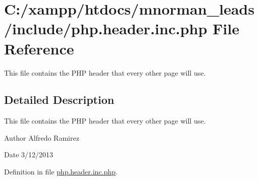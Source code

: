 \hypertarget{php_8header_8inc_8php}{\section{C\-:/xampp/htdocs/mnorman\-\_\-leads/include/php.header.\-inc.\-php File Reference}
\label{php_8header_8inc_8php}
}


This file contains the P\-H\-P header that every other page will use.  




\subsection{Detailed Description}
This file contains the P\-H\-P header that every other page will use. \begin{DoxyAuthor}{Author}
Alfredo Ramirez 
\end{DoxyAuthor}
\begin{DoxyDate}{Date}
3/12/2013 
\end{DoxyDate}


Definition in file \hyperlink{php_8header_8inc_8php_source}{php.\-header.\-inc.\-php}.

